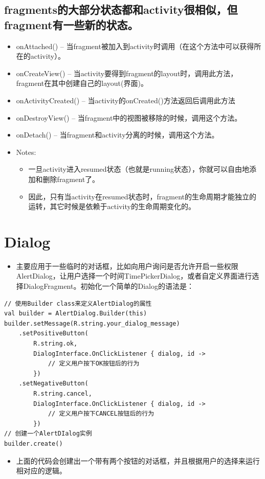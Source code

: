 \documentclass[9pt, b5paaper]{book}
\begin{document}
\subsection{fragments的大部分状态都和activity很相似，但fragment有一些新的状态。}
\label{sec-3-5-6}
\begin{itemize}
\item onAttached() -- 当fragment被加入到activity时调用（在这个方法中可以获得所在的activity）。
\item onCreateView() -- 当activity要得到fragment的layout时，调用此方法，fragment在其中创建自己的layout(界面)。
\item onActivityCreated() -- 当activity的onCreated()方法返回后调用此方法
\item onDestroyView() -- 当fragment中的视图被移除的时候，调用这个方法。
\item onDetach() -- 当fragment和activity分离的时候，调用这个方法。
\item Notes:
\begin{itemize}
\item 一旦activity进入resumed状态（也就是running状态），你就可以自由地添加和删除fragment了。
\item 因此，只有当activity在resumed状态时，fragment的生命周期才能独立的运转，其它时候是依赖于activity的生命周期变化的。
\end{itemize}
\end{itemize}
\section{Dialog}
\label{sec-3-6}
\begin{itemize}
\item 主要应用于一些临时的对话框，比如向用户询问是否允许开启一些权限AlertDialog，让用户选择一个时间TimePickerDialog，或者自定义界面进行选择DialogFragment。初始化一个简单的Dialog的语法是：
\end{itemize}
\begin{verbatim}
// 使用Builder class来定义AlertDialog的属性
val builder = AlertDialog.Builder(this)
builder.setMessage(R.string.your_dialog_message)
    .setPositiveButton(
        R.string.ok,
        DialogInterface.OnClickListener { dialog, id ->
            // 定义用户按下OK按钮后的行为
        })
    .setNegativeButton(
        R.string.cancel,
        DialogInterface.OnClickListener { dialog, id ->
            // 定义用户按下CANCEL按钮后的行为
        })
// 创建一个AlertDIalog实例
builder.create()
\end{verbatim}
\begin{itemize}
\item 上面的代码会创建出一个带有两个按钮的对话框，并且根据用户的选择来运行相对应的逻辑。
\end{itemize}
\end{document}
